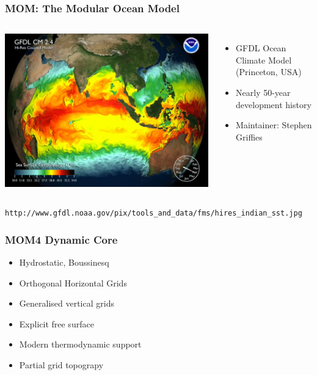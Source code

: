 \documentclass{beamer}
\begin{document}
\begin{frame}
    \frametitle{MOM: The Modular Ocean Model}

    \begin{columns}
        \includegraphics[width=\textwidth]{hires_indian_sst.jpg}
        \begin{itemize}
            \item GFDL Ocean Climate Model (Princeton, USA)
            \item Nearly 50-year development history
            \item Maintainer: Stephen Griffies
        \end{itemize}
    \end{columns}
    \vspace{10pt}
    {\tiny
     \lstinline|http://www.gfdl.noaa.gov/pix/tools_and_data/fms/hires_indian_sst.jpg|}
\end{frame}

\begin{frame}
    \frametitle{MOM4 Dynamic Core}
    
    \begin{itemize}
        \item Hydrostatic, Boussinesq
        \item Orthogonal Horizontal Grids
        \item Generalised vertical grids
		\item Explicit free surface
		\item Modern thermodynamic support
        \item Partial grid topograpy
    \end{itemize}
\end{frame}
\end{document}
